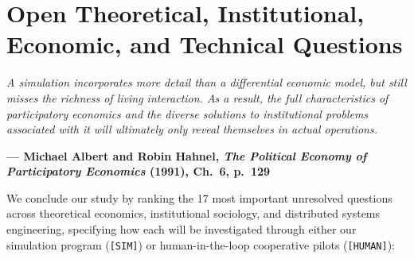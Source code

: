\documentclass[10pt,twoside,openany]{book}
\theoremstyle{dpepstyle}
\newcommand{\chapterepigraph}[2]{%
  \vspace{-0.4em}
  \begin{FlushRight}
  \begin{minipage}{0.82\textwidth}
    \itshape\small\color{SlateDark} #1\par
    \vspace{3pt}
    \upshape\footnotesize\textbf{--- #2}
  \end{minipage}
  \end{FlushRight}
  \vspace{1em}
}
\newenvironment{FlushRight}{\begin{flushright}}{\end{flushright}}
\begin{document}
\chapter{Open Theoretical, Institutional, Economic, and Technical Questions}
\label{ch:questions}

\chapterepigraph{A simulation incorporates more detail than a differential economic model, but still misses the richness of living interaction. As a result, the full characteristics of participatory economics and the diverse solutions to institutional problems associated with it will ultimately only reveal themselves in actual operations.}{Michael Albert and Robin Hahnel, \emph{The Political Economy of Participatory Economics} (1991), Ch.~6, p.~129\protect\footnotemark}

We conclude our study by ranking the 17 most important unresolved questions across theoretical economics, institutional sociology, and distributed systems engineering, specifying how each will be investigated through either our simulation program (\texttt{[SIM]}) or human-in-the-loop cooperative pilots (\texttt{[HUMAN]}):
\end{document}
